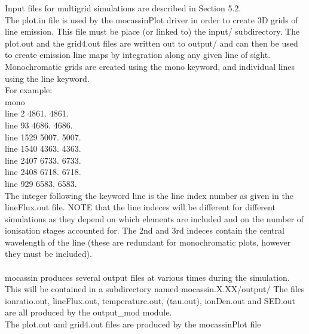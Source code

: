 \documentclass[11pt]{article}
\begin{document}
    Input files for multigrid simulations are described in Section 5.2. \\

    The plot.in file is used by the mocassinPlot driver in order to create 3D 
    grids of line emission. This file must be place (or linked to) the input/ 
    subdirectory. The plot.out and the grid4.out files are written out to output/ and 
    can then be used to create emission line
    maps by integration along any given line of sight.      \\
    Monochromatic grids are created using the mono keyword, and individual lines 
    using the line keyword. \\
\noindent    For example:\\
\indent  mono\\
\indent  line 2        4861.   4861.\\
\indent  line 93       4686.   4686.\\
\indent  line 1529     5007.   5007.\\
\indent  line 1540     4363.   4363.\\
\indent  line 2407     6733.   6733.\\
\indent  line 2408     6718.   6718.\\
\indent  line 929      6583.   6583.\\
\noindent The integer following the keyword line is the line index number as given in the 
    lineFlux.out file. NOTE that the line indeces will be different for different 
    simulations as they depend on which elements are included and on the number of 
    ionisation stages accounted for. The 2nd and 3rd indeces contain the central 
    wavelength of the line (these are redundant for monochromatic plots, however
    they must be included).      	\\

\\
    
    {\sc mocassin} produces several output files at various times during the simulation. 
    This will be contained in a subdirectory named mocassin.X.XX/output/
    The files ionratio.out,  lineFlux.out, temperature.out, (tau.out), ionDen.out
    and SED.out are all produced by the output\_mod module. \\
    The plot.out and grid4.out files are produced by the mocassinPlot file\\
\end{document}
